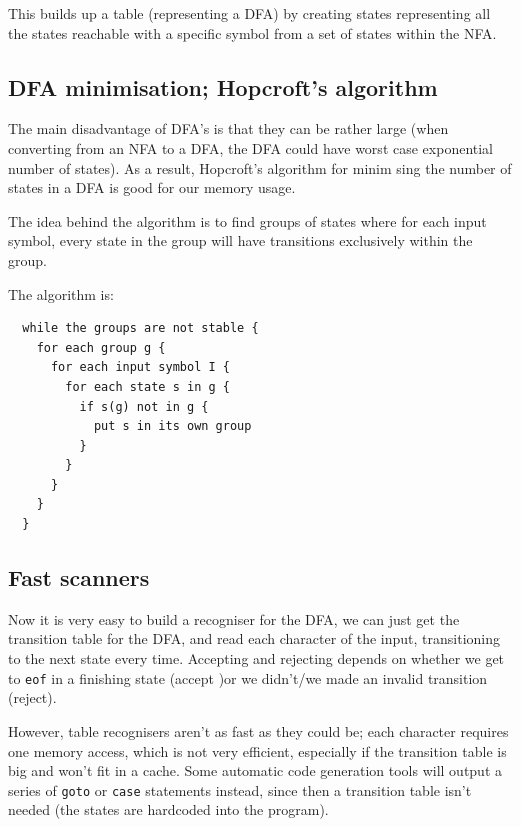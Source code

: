 This builds up a table (representing a DFA) by creating states representing all
the states reachable with a specific symbol from a set of states within the NFA.



\subsection{DFA minimisation; Hopcroft's algorithm}

The main disadvantage of DFA's is that they can be rather large (when converting
from an NFA to a DFA, the DFA could have worst case exponential number of
states). As a result, Hopcroft's algorithm for minim sing the number of states in
a DFA is good for our memory usage.

The idea behind the algorithm is to find groups of states where for each input
symbol, every state in the group will have transitions exclusively within the
group.

The algorithm is:

\begin{verbatim}
  while the groups are not stable {
    for each group g {
      for each input symbol I {
        for each state s in g {
          if s(g) not in g {
            put s in its own group
          }
        }
      }
    }
  }
\end{verbatim}



\subsection{Fast scanners}

Now it is very easy to build a recogniser for the DFA, we can just get the
transition table for the DFA, and read each character of the input,
transitioning to the next state every time. Accepting and rejecting depends on
whether we get to \texttt{eof} in a finishing state (accept )or we didn't/we
made an invalid transition (reject).

However, table recognisers aren't as fast as they could be; each character
requires one memory access, which is not very efficient, especially if the
transition table is big and won't fit in a cache. Some automatic code generation
tools will output a series of \texttt{goto} or \texttt{case} statements instead,
since then a transition table isn't needed (the states are hardcoded into the
program).

